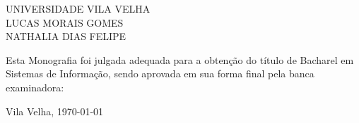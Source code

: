 ﻿%

%
% 
%
\begin{folhadeaprovacao}


\begin{center}


            {UNIVERSIDADE VILA VELHA} \\
           

    \vspace{1.5cm}
                                    {LUCAS MORAIS GOMES \\ NATHALIA DIAS FELIPE}\\
    \bfseries{}
\end{center}

Esta Monografia foi julgada adequada para a obten\c{c}\~{a}o do título  de Bacharel em Sistemas de Informação, sendo aprovada em sua forma final  pela banca examinadora:

    \vspace{2.5cm}
    \vfill

    \begin{center}
        Vila Velha, \today{}
    \end{center}
  
\end{folhadeaprovacao}